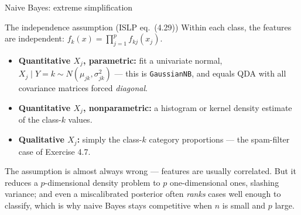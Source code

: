 \documentclass[aspectratio=169,11pt]{beamer}
\begin{document}
\begin{frame}{Naive Bayes: extreme simplification}\label{frm:nb}
  \footnotesize
  \begin{block}{The independence assumption (ISLP eq.\ (4.29))}
    Within each class, the features are independent:
    $f_k(x) = \prod_{j=1}^p f_{kj}(x_j)$.
  \end{block}
  \begin{readme}
    \begin{itemize}\itemsep1pt
      \item \textbf{Quantitative $X_j$, parametric:} fit a univariate
            normal, $X_j \mid Y{=}k \sim N(\mu_{jk},\sigma_{jk}^2)$ ---
            this is \texttt{GaussianNB}, and equals QDA with all
            covariance matrices forced \emph{diagonal}.
      \item \textbf{Quantitative $X_j$, nonparametric:} a histogram or
            kernel density estimate of the class-$k$ values.
      \item \textbf{Qualitative $X_j$:} simply the class-$k$ category
            proportions --- the spam-filter case of Exercise 4.7.
    \end{itemize}
  \end{readme}
  \begin{takeaway}
    The assumption is almost always wrong --- features are usually
    correlated. But it reduces a $p$-dimensional density problem to $p$
    one-dimensional ones, slashing variance; and even a miscalibrated
    posterior often \emph{ranks} cases well enough to classify, which is
    why naive Bayes stays competitive when $n$ is small and $p$ large.
  \end{takeaway}
\end{frame}


\end{document}
